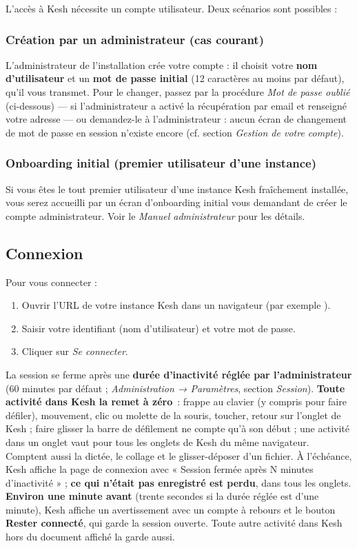 \documentclass[a4paper,11pt,oneside]{article}
\begin{document}
L'accès à Kesh nécessite un compte utilisateur. Deux scénarios sont possibles :

\subsubsection{Création par un administrateur (cas courant)}

L'administrateur de l'installation crée votre compte : il choisit votre \textbf{nom d'utilisateur} et un \textbf{mot de passe initial} (12 caractères au moins par défaut), qu'il vous transmet. Pour le changer, passez par la procédure \emph{Mot de passe oublié} (ci-dessous) --- si l'administrateur a activé la récupération par email et renseigné votre adresse --- ou demandez-le à l'administrateur : aucun écran de changement de mot de passe en session n'existe encore (cf. section \emph{Gestion de votre compte}).

\subsubsection{Onboarding initial (premier utilisateur d'une instance)}

Si vous êtes le tout premier utilisateur d'une instance Kesh fraîchement installée, vous serez accueilli par un écran d'onboarding initial vous demandant de créer le compte administrateur. Voir le \emph{Manuel administrateur} pour les détails.

\subsection{Connexion}

Pour vous connecter :

\begin{enumerate}
    \item Ouvrir l'URL de votre instance Kesh dans un navigateur (par exemple ).
    \item Saisir votre identifiant (nom d'utilisateur) et votre mot de passe.
    \item Cliquer sur \emph{Se connecter}.
\end{enumerate}

La session se ferme après une \textbf{durée d'inactivité réglée par l'administrateur} (60 minutes par défaut ; \emph{Administration → Paramètres}, section \emph{Session}). \textbf{Toute activité dans Kesh la remet à zéro}~: frappe au clavier (y compris pour faire défiler), mouvement, clic ou molette de la souris, toucher, retour sur l'onglet de Kesh ; faire glisser la barre de défilement ne compte qu'à son début ; une activité dans un onglet vaut pour tous les onglets de Kesh du même navigateur. Comptent aussi la dictée, le collage et le glisser-déposer d'un fichier. À l'échéance, Kesh affiche la page de connexion avec « Session fermée après N minutes d'inactivité » ; \textbf{ce qui n'était pas enregistré est perdu}, dans tous les onglets. \textbf{Environ une minute avant} (trente secondes si la durée réglée est d'une minute), Kesh affiche un avertissement avec un compte à rebours et le bouton \textbf{Rester connecté}, qui garde la session ouverte. Toute autre activité dans Kesh hors du document affiché la garde aussi.
\end{document}
